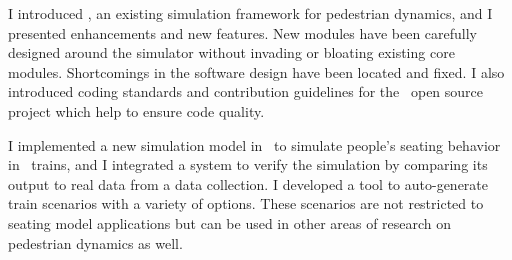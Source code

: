 I introduced \vadere, an existing simulation framework for pedestrian dynamics,
and I presented enhancements and new features.
New modules have been carefully designed around the simulator without invading
or bloating existing core modules.
Shortcomings in the software design have been located and fixed.
I also introduced coding standards and contribution guidelines for the \vadere\
open source project which help to ensure code quality.

I implemented a new simulation model in \vadere\ to simulate people's seating
behavior in \sbahn\ trains, and I integrated a system to verify the simulation
by comparing its output to real data from a data collection.
I developed a tool to auto-generate train scenarios with a variety of options.
These scenarios are not restricted to seating model applications but can be used
in other areas of research on pedestrian dynamics as well.

